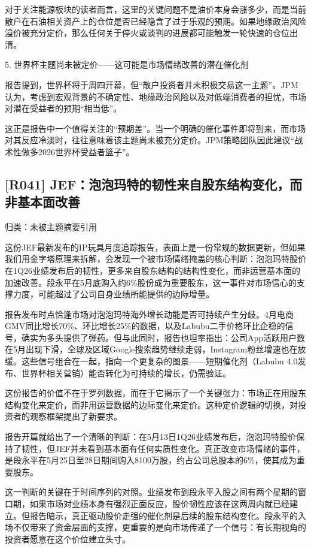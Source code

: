 \documentclass[11pt]{ctexart}
\begin{document}
对于关注能源板块的读者而言，这里的关键问题不是油价本身会涨多少，而是当前散户在石油相关资产上的仓位是否已经隐含了过于乐观的预期。如果地缘政治风险溢价被充分定价，那么任何关于停火或谈判的进展都可能触发一轮快速的仓位出清。

5. 世界杯主题尚未被定价——这可能是市场情绪改善的潜在催化剂

报告提到，世界杯将于周四开幕，但“散户投资者并未积极交易这一主题”。JPM认为，考虑到宏观背景的不确定性、地缘政治风险以及对低端消费者的担忧，市场对潜在受益者的预期“相当低”。

这正是报告中一个值得关注的“预期差”。当一个明确的催化事件即将到来，而市场对其反应冷淡时，往往意味着该主题尚未被充分定价。JPM策略团队因此建议“战术性做多2026世界杯受益者篮子”。

\subsection{[R041] JEF：泡泡玛特的韧性来自股东结构变化，而非基本面改善}
{\small\color{refgray}归类：未被主题摘要引用}

这份JEF最新发布的IP玩具月度追踪报告，表面上是一份常规的数据更新，但如果我们用金字塔原理来拆解，会发现一个被市场情绪掩盖的核心判断：泡泡玛特股价在1Q26业绩发布后的韧性，更多来自股东结构的结构性变化，而非运营基本面的加速改善。段永平在5月底购入约6\%股份成为重要股东，这一事件对市场信心的支撑力度，可能超过了公司自身业绩所能提供的边际增量。

报告发布时点恰逢市场对泡泡玛特海外增长动能是否可持续产生分歧。4月电商GMV同比增长70\%、环比增长25\%的数据，以及Labubu二手价格环比企稳的信号，确实为多头提供了弹药。但与此同时，报告也坦率指出：公司App活跃用户数在5月出现下滑，全球及区域Google搜索趋势继续走弱，Instagram粉丝增速也在放缓。这些信号组合在一起，指向一个更复杂的图景——短期催化剂（Labubu 4.0发布、世界杯相关营销）能否转化为可持续的增长，仍需验证。

这份报告的价值不在于罗列数据，而在于它揭示了一个关键张力：市场正在用股东结构变化来定价，而非用运营数据的边际变化来定价。这种定价逻辑的切换，对投资者的观察框架提出了新要求。

报告开篇就给出了一个清晰的判断：在5月13日1Q26业绩发布后，泡泡玛特股价保持了韧性，但JEF并未看到基本面有任何实质性变化。真正改变市场情绪的事件，是段永平在5月25日至28日期间购入8100万股，约占公司总股本的6\%，使其成为重要股东。

这一判断的关键在于时间序列的对照。业绩发布到段永平入股之间有两个星期的窗口期，如果市场对业绩本身有强烈正面反应，股价韧性应该在这两周内就已经建立。但报告暗示，真正驱动股价走强的催化剂是后续的股东结构变化。段永平的入场不仅带来了资金层面的支撑，更重要的是向市场传递了一个信号：有长期视角的投资者愿意在这个价位建立头寸。
\end{document}
